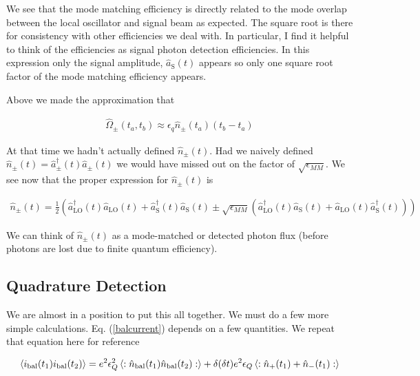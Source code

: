\documentclass[12pt]{article}
\begin{document}
We see that the mode matching efficiency is directly related to the mode overlap between the local oscillator and signal beam as expected. The square root is there for consistency with other efficiencies we deal with. In particular, I find it helpful to think of the efficiencies as signal photon detection efficiencies. In this expression only the signal amplitude, $\hat{a}_{\text{S}}(t)$ appears so only one square root factor of the mode matching efficiency appears.

Above we made the approximation that 

\begin{align}
\hat{\Omega}_{\pm}(t_a,t_b) \approx \epsilon_q \hat{n}_{\pm}(t_a)(t_b -t_a)
\end{align}

At that time we hadn't actually defined $\hat{n}_{\pm}(t)$. Had we naively defined $\hat{n}_{\pm}(t) = \hat{a}^{\dag}_{\pm}(t)\hat{a}_{\pm}(t)$ we would have missed out on the factor of $\sqrt{\epsilon_{MM}}$. We see now that the proper expression for $\hat{n}_{\pm}(t)$ is

\begin{align}
\hat{n}_{\pm}(t) = \frac{1}{2}  \left(\hat{a}^{\dag}_{\text{LO}}(t) \hat{a}_{\text{LO}}(t) + \hat{a}^{\dag}_{\text{S}}(t) \hat{a}_{\text{S}}(t) \pm \sqrt{\epsilon_{MM}} \left(\hat{a}^{\dag}_{\text{LO}}(t)\hat{a}_{\text{S}}(t) + \hat{a}_{\text{LO}}(t)\hat{a}^{\dag}_{\text{S}}(t) \right)\right)
\end{align}

We can think of $\hat{n}_{\pm}(t)$ as a mode-matched or detected photon flux (before photons are lost due to finite quantum efficiency).

\subsection{Quadrature Detection}

We are almost in a position to put this all together. We must do a few more simple calculations. Eq. (\ref{balcurrent}) depends on a few quantities. We repeat that equation here for reference

\begin{align}
\Braket{i_{\text{bal}}(t_1)i_{\text{bal}}(t_2)} = e^2\epsilon_Q^2 \Braket{:\hat{n}_{\text{bal}}(t_1) \hat{n}_{\text{bal}}(t_2) :} + \delta(\delta t)e^2\epsilon_Q \Braket{: \hat{n}_+(t_1) + \hat{n}_-(t_1):}\\
\end{align}
\end{document}
